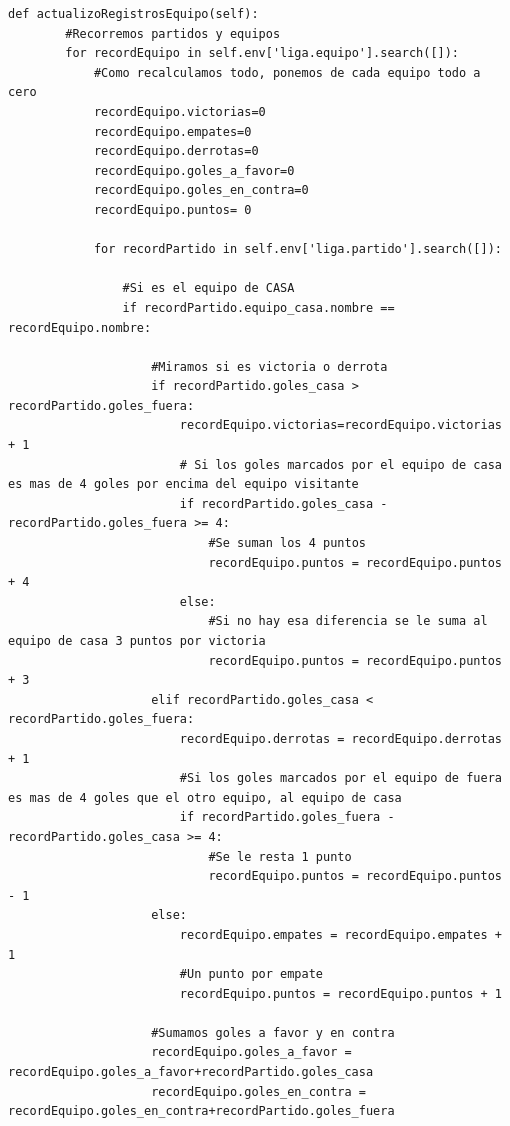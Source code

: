 \documentclass[a4paper,12pt]{article}
\begin{document}
\vspace{0.5cm}
\begin{lstlisting}[style=javascript]
def actualizoRegistrosEquipo(self):
        #Recorremos partidos y equipos
        for recordEquipo in self.env['liga.equipo'].search([]):
            #Como recalculamos todo, ponemos de cada equipo todo a cero
            recordEquipo.victorias=0
            recordEquipo.empates=0
            recordEquipo.derrotas=0
            recordEquipo.goles_a_favor=0
            recordEquipo.goles_en_contra=0
            recordEquipo.puntos= 0
            
            for recordPartido in self.env['liga.partido'].search([]):  
        
                #Si es el equipo de CASA
                if recordPartido.equipo_casa.nombre == recordEquipo.nombre:
                    
                    #Miramos si es victoria o derrota
                    if recordPartido.goles_casa > recordPartido.goles_fuera:
                        recordEquipo.victorias=recordEquipo.victorias + 1
                        # Si los goles marcados por el equipo de casa es mas de 4 goles por encima del equipo visitante
                        if recordPartido.goles_casa - recordPartido.goles_fuera >= 4:
                            #Se suman los 4 puntos
                            recordEquipo.puntos = recordEquipo.puntos + 4
                        else:
                            #Si no hay esa diferencia se le suma al equipo de casa 3 puntos por victoria
                            recordEquipo.puntos = recordEquipo.puntos + 3
                    elif recordPartido.goles_casa < recordPartido.goles_fuera:
                        recordEquipo.derrotas = recordEquipo.derrotas + 1
                        #Si los goles marcados por el equipo de fuera es mas de 4 goles que el otro equipo, al equipo de casa
                        if recordPartido.goles_fuera - recordPartido.goles_casa >= 4:
                            #Se le resta 1 punto 
                            recordEquipo.puntos = recordEquipo.puntos - 1
                    else:
                        recordEquipo.empates = recordEquipo.empates + 1
                        #Un punto por empate 
                        recordEquipo.puntos = recordEquipo.puntos + 1
                        
                    #Sumamos goles a favor y en contra
                    recordEquipo.goles_a_favor = recordEquipo.goles_a_favor+recordPartido.goles_casa
                    recordEquipo.goles_en_contra = recordEquipo.goles_en_contra+recordPartido.goles_fuera


\end{lstlisting}
\end{document}
